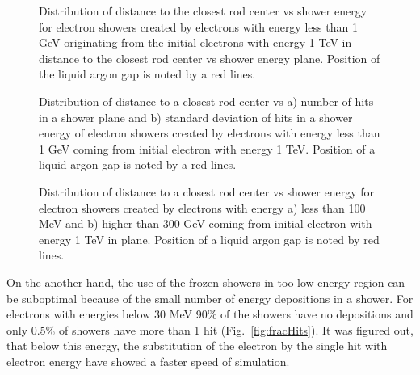 \begin{figure}[!tbp]
\caption{Distribution of distance to the closest rod center vs shower energy for electron showers created by electrons with energy less than 1 GeV originating from the initial electrons with energy 1 TeV in distance to the closest rod center vs shower energy plane. Position of the liquid argon gap is noted by a red lines. }
\label{fig:FSProduction}
\end{figure}

\begin{figure}[!tbp]
\begin{minipage}[h]{0.49\linewidth}
\end{minipage}
\hfill
\begin{minipage}[h]{0.49\linewidth}
\end{minipage}
\caption{Distribution of distance to a closest rod center vs a) number of hits in a shower plane and b) standard deviation of hits in a shower energy of electron showers created by electrons with energy less than 1 GeV coming from initial electron with energy 1 TeV. Position of a liquid argon gap is noted by a red lines.}
\label{fig:ShowerProp}
\end{figure}

\begin{figure}[!tbp]
\begin{minipage}[h]{0.49\linewidth}
\end{minipage}
\hfill
\begin{minipage}[h]{0.49\linewidth}
\end{minipage}
\caption{Distribution of distance to a closest rod center vs shower energy for electron showers created by electrons with energy a) less than 100 MeV  and b) higher than 300 GeV coming from initial electron with energy 1 TeV in  plane. Position of a liquid argon gap is noted by red lines. }
\label{fig:FSProduction2}
\end{figure}

On the another hand, the use of the frozen showers in too low energy region can be suboptimal because of the small number of energy depositions in a shower. For electrons with energies below 30 MeV 90\% of the showers have no depositions and only 0.5\% of showers have more than 1 hit (Fig.~\ref{fig:fracHits}). It was figured out, that below this energy, the substitution of the electron by the single hit with electron energy have showed a faster speed of simulation.

